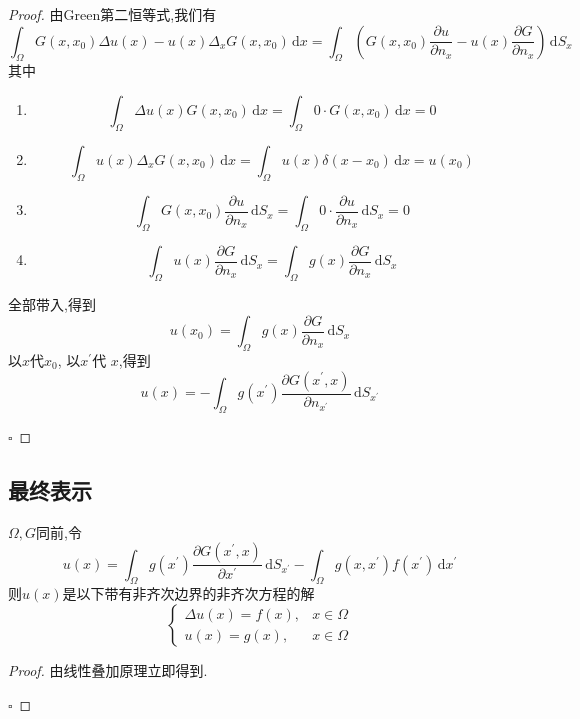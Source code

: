 \documentclass[../../main.tex]{subfiles}
\begin{document}
\begin{proof}
    由Green第二恒等式,我们有 \[
    \int_{ \Omega } G\left( x,x_0 \right)\Delta u\left( x \right)-u\left( x \right) \Delta _{x}G\left( x,x_0 \right)\,\mathrm{d} x=  \int_{ \Omega }\left( G\left( x,x_0 \right)\frac{\partial u}{\partial n_{x}}-u\left( x \right)\frac{\partial G}{\partial n_{x}} \right) \,\mathrm{d} S_{x}      
    \]其中 
    \begin{enumerate}
        \item  \[
    \int_{ \Omega } \Delta u\left( x \right)G\left( x,x_0 \right)\,\mathrm{d} x= \int_{ \Omega }0\cdot G\left( x,x_0 \right)\,\mathrm{d} x= 0   
    \] 
    \item \[
    \int_{ \Omega }u\left( x \right) \Delta _{x}G\left( x,x_0 \right)\,\mathrm{d} x=  \int_{ \Omega }u\left( x \right) \delta \left( x-x_0 \right)\,\mathrm{d} x= u\left( x_0 \right)     
    \]
    \item \[
    \int_{ \Omega }G\left( x,x_0 \right)\frac{\partial u}{\partial n_{x}}\,\mathrm{d} S_{x}= \int_{ \Omega }0\cdot \frac{\partial u}{\partial n_{x}} \,\mathrm{d} S_{x}= 0
    \] 
    \item \[
    \int_{ \Omega }u\left( x \right)\frac{\partial G}{\partial n_{x}}\,\mathrm{d} S_{x}= \int_{ \Omega }g\left( x \right)\frac{\partial G}{\partial n_{x}}  \,\mathrm{d} S_{x}
    \]
    \end{enumerate}
   全部带入,得到 \[
    u\left( x_0 \right)= \int_{ \Omega }g\left( x \right)\frac{\partial G}{\partial n_{x}}\,\mathrm{d} S_{x}  
    \]以\(  x  \)代\(  x_0  \), 以\(  x^{\prime}   \)代 \(  x  \),得到     \[
    u\left( x \right)= -\int_{ \Omega }g\left( x ^{\prime} \right) \frac{\partial G\left( x^{\prime} ,x \right) }{\partial n_{x^{\prime} }}\,\mathrm{d} S_{x^{\prime} }  
    \]

    \hfill $\square$
\end{proof}
\subsection{最终表示}
 \begin{theorem}
    \(   \Omega ,G  \)同前,令  \[
    u\left( x \right)= \int_{ \Omega }g\left( x^{\prime}  \right)\frac{\partial G\left( x^{\prime} ,x \right) }{\partial x^{\prime} }\,\mathrm{d} S_{x^{\prime} }  -\int_{ \Omega }g\left( x,x^{\prime}  \right)f\left( x^{\prime}  \right)\,\mathrm{d} x^{\prime}   
    \]则\(  u\left( x \right)   \)是以下带有非齐次边界的非齐次方程的解 \[
    \begin{cases}  \Delta u\left( x \right)= f\left( x \right),&x\in  \Omega \\ 
     u\left( x \right)= g\left( x \right),&x\in  \Omega      \end{cases} 
    \] 
 \end{theorem}
 \begin{proof}
    由线性叠加原理立即得到.
 
    \hfill $\square$
 \end{proof}
\end{document}
